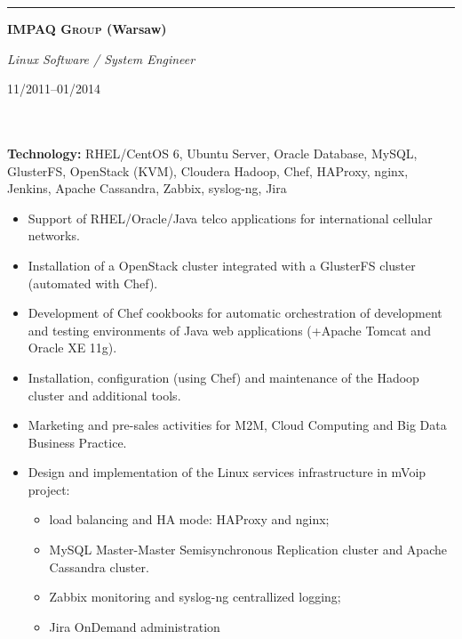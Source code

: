 \documentclass[$fontsize$, a4paper]{article}
\newcommand\textbox[1]{%
  \parbox{.333\textwidth}{#1}%
}
\newcommand{\note}[1]{\marginnote{\scriptsize #1}}
\begin{document}
\noindent\rule[0.5ex]{\linewidth}{1pt}

\noindent\textbox{\textbf{\textsc{IMPAQ Group} (Warsaw)}\hfill}\textbox{\hfil \emph{Linux Software / System Engineer}\hfil}\textbox{\hfill 11/2011--01/2014}\\\\
\textbf{Technology:} RHEL/CentOS 6, Ubuntu Server, Oracle Database, MySQL, GlusterFS, OpenStack (KVM), Cloudera Hadoop, Chef, HAProxy, nginx, Jenkins, Apache Cassandra, Zabbix, syslog-ng, Jira

\vspace{10pt}
\begin{itemize}
  \item Support of RHEL/Oracle/Java telco applications for international cellular networks.
  \item Installation of a OpenStack cluster integrated with a GlusterFS cluster (automated with Chef).
  \item Development of Chef cookbooks for automatic orchestration of development and testing environments of Java web applications (+Apache Tomcat and Oracle XE 11g).
  \item Installation, configuration (using Chef) and maintenance of the Hadoop cluster and additional tools.
  \item Marketing and pre-sales activities for M2M, Cloud Computing and Big Data Business Practice.

  \item Design and implementation of the Linux services infrastructure in mVoip project:
  \begin{itemize}
    \item load balancing and HA mode: HAProxy and nginx;
    \item MySQL Master-Master Semisynchronous Replication cluster and Apache Cassandra cluster.
    \item Zabbix monitoring and syslog-ng centrallized logging;
    \item Jira OnDemand administration
  \end{itemize}

\end{itemize}


\end{document}
